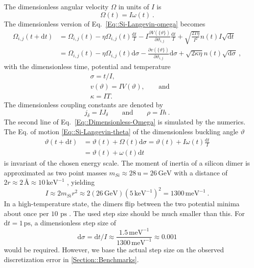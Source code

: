 	The dimensionless angular velocity $\Omega$ in units of $I$ is
	\begin{equation}
		\Omega(t) =	I\omega(t)~.
	\end{equation}
	The dimensionless version of Eq.~\eqref{Eq::Si-Langevin-omega} becomes
	\begin{equation} \label{Eq::Dimensionless-Omega}
		\begin{split}
			\Omega_{i,j}(t + \text{d}t) &=	\Omega_{i,j}(t) - \eta \Omega_{i,j}(t) \frac{\text{d}t}{I} - {I}\frac{\partial V(\{\vartheta\})}{\partial \vartheta_{i,j}} \frac{\text{d}t}{I} + \sqrt{\frac{2 T \eta}{I^2}} n(t) I \sqrt{\text{d}t} \\
			&=	\Omega_{i,j}(t) - \eta \Omega_{i,j}(t) \text{d}\sigma - \frac{\partial v(\{\vartheta\})}{\partial \vartheta_{i,j}} \text{d}\sigma + \sqrt{{2 \kappa \eta}} n(t) \sqrt{\text{d}\sigma}~,
		\end{split}
	\end{equation}
	with the dimensionless time, potential and temperature
	\begin{align}
		&\sigma =	t /	I, \\
		&v(\vartheta) =	I V(\vartheta), \qquad \text{and} \\
		&\kappa =	IT.
	\end{align}
	The dimensionless coupling constants are denoted by
	\begin{equation} \label{Eq::dimensionless-coupling}
		j_\delta =	IJ_\delta \qquad \text{and} \qquad \rho = I h~.
	\end{equation}
	The second line of Eq.~\eqref{Eq::Dimensionless-Omega} is simulated by the numerics. The Eq. of motion \eqref{Eq::Si-Langevin-theta} of the dimensionless buckling angle $\vartheta$ 
	\begin{equation}
		\begin{split}
			\vartheta(t + \text{d}t) &=	\vartheta(t) + \Omega(t) \text{d}\sigma =	\vartheta(t) + I \omega(t) \frac{\text{d}t}{I} \\
			&= \vartheta(t) + \omega(t) \text{d}t
		\end{split}
	\end{equation}
	is invariant of the chosen energy scale. The moment of inertia of a silicon dimer is approximated as two point masses $m_{Si} \approx 28\,\text{u} =	26\, \text{GeV}$ with a distance of $2r \approx 2\,\text{\AA} \approx 10\, \text{keV}^{-1}$ \cite{ramstad1995theoretical}, yielding
	\begin{equation}
		I \approx 2m_{Si} r^2 \approx	2 \left(26 \,\text{GeV}\right) \left(5 \,\text{keV}^{-1}\right)^2 =	1300\, \text{meV}^{-1}~.
	\end{equation}
	 In a high-temperature state, the dimers flip between the two potential minima about once per $10 \text{ ps}$ \cite{dabrowski1992self}. The used step size should be much smaller than this. For $\text{d}t =	1\, \text{ps}$, a dimensionless step size of
	\begin{equation}
		\text{d} \sigma =	\text{d}t / I \approx \frac{1.5\, \text{meV}^{-1}}{1300\, \text{meV}^{-1}} \approx 0.001
	\end{equation}
	would be required. However, we base the actual step size on the observed discretization error in \autoref{Section::Benchmarks}. 
